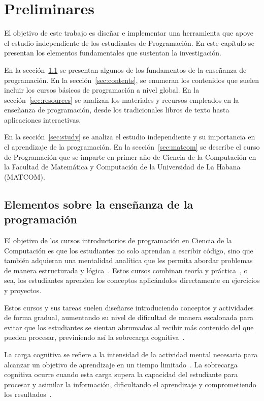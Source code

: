 \chapter{Preliminares}\label{chapter:background}

El objetivo de este trabajo es diseñar e implementar una herramienta que apoye el estudio independiente de los estudiantes de Programación. En este capítulo se presentan los elementos fundamentales que sustentan la investigación.

En la sección~\ref{sec:ensenanza_programacion} se presentan algunos de los fundamentos de la enseñanza de programación. En la sección~\ref{sec:contents}, se enumeran los contenidos que suelen incluir los cursos básicos de programación a nivel global. En la sección~\ref{sec:resources} se analizan los materiales y recursos empleados en la enseñanza de programación, desde los tradicionales libros de texto hasta aplicaciones interactivas.

En la sección~\ref{sec:study} se analiza el estudio independiente y su importancia en el aprendizaje de la programación. En la sección~\ref{sec:matcom} se describe el curso de Programación que se imparte en primer año de Ciencia de la Computación en la Facultad de Matemática y Computación de la Universidad de La Habana (\mbox{MATCOM}).

\section{Elementos sobre la enseñanza de la programación}\label{sec:ensenanza_programacion}

El objetivo de los cursos introductorios de programación en Ciencia de la Computación es que los estudiantes no solo aprendan a escribir código, sino que también adquieran una mentalidad analítica que les permita abordar problemas de manera estructurada y lógica~\cite{JOHNLEMAY2021100056}. Estos cursos combinan teoría y práctica~\cite{Sarsa_2022}, o sea, los estudiantes aprenden los conceptos aplicándolos directamente en ejercicios y proyectos.

Estos cursos y sus tareas suelen diseñarse introduciendo conceptos y actividades de forma gradual, aumentando su nivel de dificultad de manera escalonada para evitar que los estudiantes se sientan abrumados al recibir más contenido del que pueden procesar, previniendo así la sobrecarga cognitiva~\cite{duran2021clt}.

La carga cognitiva se refiere a la intensidad de la actividad mental necesaria para alcanzar un objetivo de aprendizaje en un tiempo limitado~\cite{duran2021clt}. La sobrecarga cognitiva ocurre cuando esta carga supera la capacidad del estudiante para procesar y asimilar la información, dificultando el aprendizaje y comprometiendo los resultados~\cite{duran2021clt}. 

